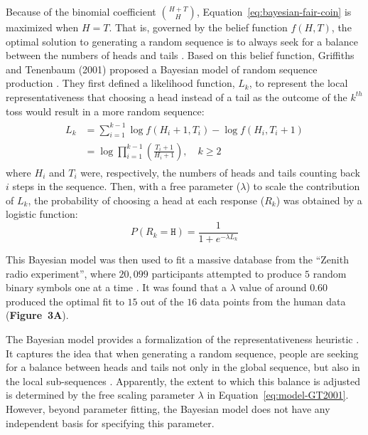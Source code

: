 \documentclass{pnastwo}
\begin{document}
\begin{article}
Because of the binomial coefficient $\binom{H+T}{H}$, Equation~\ref{eq:bayesian-fair-coin} is maximized when $H=T$.
That is, governed by the belief function $f(H,T)$, the optimal solution to generating a random sequence is to always seek for a balance between the numbers of heads and tails \cite{Nickerson2002}.
Based on this belief function, Griffiths and Tenenbaum (2001) proposed a Bayesian model of random sequence production \cite{Griffiths2001}.
They first defined a likelihood function, $L_k$, to represent the local representativeness that choosing a head instead of a tail as the outcome of the $k^{th}$ toss would result in a more random sequence:
\begin{align}\label{eq:log-likelihood-L}
  \begin{split}
  L_k &= \sum_{i=1}^{k-1} \log f(H_i + 1, T_i) - \log f(H_i, T_i + 1) \\
      &= \log \prod_{i=1}^{k-1} \left(\frac{T_i + 1}{H_i + 1} \right), \quad k \geq 2
  \end{split}
\end{align}
where $H_i$ and $T_i$ were, respectively, the numbers of heads and tails counting back $i$ steps in the sequence.
Then, with a free parameter ($\lambda$) to scale the contribution of $L_k$, the probability of choosing a head at each response ($R_k$) was obtained by a logistic function:
\begin{equation}\label{eq:model-GT2001}
    P(R_k = \mathtt{H}) = \frac{1}{1+e^{-\lambda L_k}}
\end{equation}

This Bayesian model was then used to fit a massive database from the ``Zenith radio experiment'', where $20,\!099$ participants attempted to produce $5$ random binary symbols one at a time \cite{Goodfellow1938}.
It was found that a $\lambda$ value of around $0.60$ produced the optimal fit to $15$ out of the $16$ data points from the human data (\textbf{Figure~3A}).


The Bayesian model provides a formalization of the representativeness heuristic \cite{Tversky1971,Tversky1974}.
It captures the idea that when generating a random sequence, people are seeking for a balance between heads and tails not only in the global sequence, but also in the local sub-sequences \cite{Nickerson2002}.
Apparently, the extent to which this balance is adjusted is determined by the free scaling parameter $\lambda$ in Equation~\ref{eq:model-GT2001}.
However, beyond parameter fitting, the Bayesian model does not have any independent basis for specifying this parameter.


\end{article}
\end{document}
